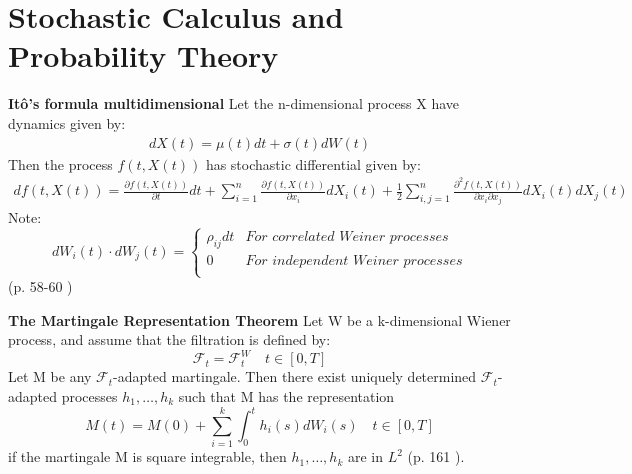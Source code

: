 
\chapter{Stochastic Calculus and Probability Theory} %

\label{AppendixA} %

\begin{theorem}\label{Ito}
\textbf{Itô's formula multidimensional} Let the n-dimensional process X have dynamics given by:
\begin{align}
dX(t)=\mu(t)dt+\sigma(t)dW(t)
\end{align}
Then the process $f(t,X(t))$ has stochastic differential given by:
\begin{equation}
\begin{split}
df(t,X(t))=\frac{\partial f(t,X(t))}{\partial t}  dt + \sum_{i=1}^{n} \frac{\partial f(t,X(t))}{\partial x_i}  dX_i(t) + \frac{1}{2} \sum_{i,j=1}^{n} \frac{\partial^2 f(t,X(t))}{\partial x_i \partial x_j}  dX_i(t)dX_j(t)  
\end{split}
\end{equation}
Note: \[ dW_i(t) \cdot dW_j(t)= \begin{cases} 
      \rho_{ij}dt & \textit{For correlated Weiner processes} \\
      0 & \textit{For independent Weiner processes} \\
   \end{cases}
\]
(p. 58-60 \parencite{finKont})
\end{theorem}

\begin{theorem}\label{MRT}
\textbf{The Martingale Representation Theorem} 
Let W be a k-dimensional Wiener process, and assume that the filtration is defined by:
$$\mathcal{F}_t=\mathcal{F}_t^W \quad t\in [0,T]$$
Let M be any $\mathcal{F}_t$-adapted martingale. Then there exist uniquely determined $\mathcal{F}_t$-adapted processes $h_1, \ldots, h_k$ such that M has the representation
$$M(t)=M(0) + \sum_{i=1}^{k} \int_{0}^{t} h_i(s)dW_i(s) \quad t \in [0,T]$$
if the martingale M is square integrable, then $h_1, \ldots, h_k$ are in $L^2$ (p. 161 \parencite{finKont}).
\end{theorem}

